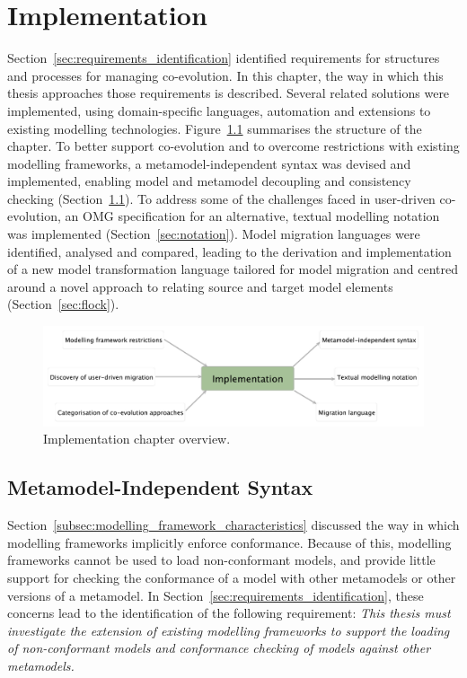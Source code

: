 
\chapter{Implementation}
\label{Implementation}
Section~\ref{sec:requirements_identification} identified requirements for structures and processes for managing co-evolution. In this chapter, the way in which this thesis approaches those requirements is described. Several related solutions were implemented, using domain-specific languages, automation and extensions to existing modelling technologies. Figure~\ref{fig:implementation_overview} summarises the structure of the chapter. To better support co-evolution and to overcome restrictions with existing modelling frameworks, a metamodel-independent syntax was devised and implemented, enabling model and metamodel decoupling and consistency checking (Section~\ref{sec:mmi_syntax}). To address some of the challenges faced in user-driven co-evolution, an OMG specification for an alternative, textual modelling notation was implemented (Section~\ref{sec:notation}). Model migration languages were identified, analysed and compared, leading to the derivation and implementation of a new model transformation language tailored for model migration and centred around a novel approach to relating source and target model elements (Section~\ref{sec:flock}). 

\begin{figure}[htbp]
  \begin{center}
    \leavevmode
    \includegraphics[width=12cm]{5.Implementation/overview.pdf}
  \end{center}
  \caption{Implementation chapter overview.}
  \label{fig:implementation_overview}
\end{figure}


\section{Metamodel-Independent Syntax}
\label{sec:mmi_syntax}
Section~\ref{subsec:modelling_framework_characteristics} discussed the way in which modelling frameworks implicitly enforce conformance. Because of this, modelling frameworks cannot be used to load non-conformant models, and provide little support for checking the conformance of a model with other metamodels or other versions of a metamodel. In Section~\ref{sec:requirements_identification}, these concerns lead to the identification of the following requirement: \emph{This thesis must investigate the extension of existing modelling frameworks to support the loading of non-conformant models and conformance checking of models against other metamodels.}

